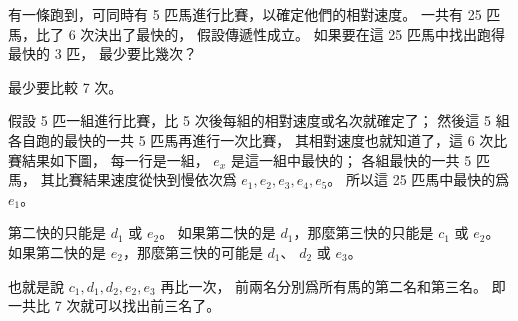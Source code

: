 
\startEXERCISE
有一條跑到，可同時有 5 匹馬進行比賽，以確定他們的相對速度。
一共有 25 匹馬，比了 6 次決出了最快的，
假設傳遞性成立。
如果要在這 25 匹馬中找出跑得最快的 3 匹，
最少要比幾次？
\stopEXERCISE

\startANSWER
最少要比較 7 次。

假設 5 匹一組進行比賽，比 5 次後每組的相對速度或名次就確定了；
然後這 5 組各自跑的最快的一共 5 匹馬再進行一次比賽，
其相對速度也就知道了，這 6 次比賽結果如下圖，
每一行是一組， $e_x$ 是這一組中最快的；
各組最快的一共 5 匹馬，
其比賽結果速度從快到慢依次爲 $e_1,e_2,e_3,e_4,e_5$。
所以這 25 匹馬中最快的爲 $e_1$。

\externalfigure[output/e9_1_3-1]

第二快的只能是 $d_1$ 或 $e_2$。
如果第二快的是 $d_1$，那麼第三快的只能是 $c_1$ 或 $e_2$。
如果第二快的是 $e_2$，那麼第三快的可能是 $d_1$、 $d_2$ 或 $e_3$。

也就是說 $c_1,d_1,d_2,e_2,e_3$ 再比一次，
前兩名分別爲所有馬的第二名和第三名。
即一共比 7 次就可以找出前三名了。


\stopANSWER
